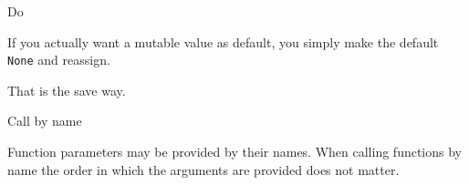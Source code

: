 \begin{frame}[fragile]

\begin{block}{Do}

If you actually want a mutable value as default, you simply make the
default \texttt{None} and reassign.

\begin{Shaded}
\begin{Highlighting}[]
 \NormalTok{):}
       
\end{Highlighting}
\end{Shaded}

That is the save way.

\end{block}

\end{frame}

\begin{frame}[fragile]{Call by name}

Function parameters may be provided by their names. When calling
functions by name the order in which the arguments are provided does not
matter.

\begin{Shaded}
\begin{Highlighting}[]
 
     

\NormalTok{, }\NormalTok{, }\NormalTok{)}
\NormalTok{)}
\NormalTok{)}
\NormalTok{)}
\end{Highlighting}
\end{Shaded}

\end{frame}

